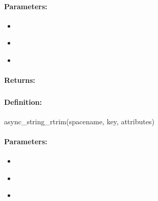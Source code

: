\paragraph{Parameters:}
\begin{itemize}[noitemsep]
\item {}\\

\item {}\\

\item {}\\

\end{itemize}

\paragraph{Returns:}


\pagebreak
\subsubsection{}
\label{api:ruby:async_string_rtrim}


\paragraph{Definition:}
\begin{rubycode}
async_string_rtrim(spacename, key, attributes)
\end{rubycode}

\paragraph{Parameters:}
\begin{itemize}[noitemsep]
\item {}\\

\item {}\\

\item {}\\

\end{itemize}

